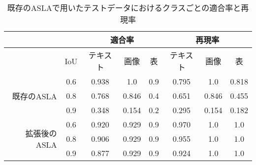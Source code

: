 \begin{table}[t]
    \caption{既存のASLAで用いたテストデータにおけるクラスごとの適合率と再現率}
    \label{tab:precision_recall_ocr}
    \centering
    \begin{tabular}{rc|ccc|ccc}
        \hline
                                      &     & \multicolumn{3}{c}{適合率} & \multicolumn{3}{c}{再現率}                                  \\
        \hline
                                      & IoU & テキスト                   & 画像                       & 表  & テキスト & 画像  & 表    \\
        \hline \hline
        \multirow{3}{*}{既存のASLA}   & 0.6 & 0.938                      & 1.0                        & 0.9 & 0.795    & 1.0   & 0.818 \\
                                      & 0.8 & 0.768                      & 0.846                      & 0.4 & 0.651    & 0.846 & 0.455 \\
                                      & 0.9 & 0.348                      & 0.154                      & 0.2 & 0.295    & 0.154 & 0.182 \\
        \hline
        \multirow{3}{*}{拡張後のASLA} & 0.6 & 0.920                      & 0.929                      & 0.9 & 0.970    & 1.0   & 1.0   \\
                                      & 0.8 & 0.906                      & 0.929                      & 0.9 & 0.955    & 1.0   & 1.0   \\
                                      & 0.9 & 0.877                      & 0.929                      & 0.9 & 0.924    & 1.0   & 1.0   \\
        \hline
    \end{tabular}
\end{table}


